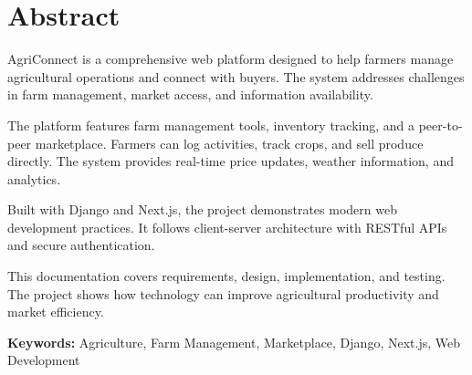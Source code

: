 \section*{Abstract}

AgriConnect is a comprehensive web platform designed to help farmers manage agricultural operations and connect with buyers. The system addresses challenges in farm management, market access, and information availability.

The platform features farm management tools, inventory tracking, and a peer-to-peer marketplace. Farmers can log activities, track crops, and sell produce directly. The system provides real-time price updates, weather information, and analytics.

Built with Django and Next.js, the project demonstrates modern web development practices. It follows client-server architecture with RESTful APIs and secure authentication.

This documentation covers requirements, design, implementation, and testing. The project shows how technology can improve agricultural productivity and market efficiency.

\textbf{Keywords:} Agriculture, Farm Management, Marketplace, Django, Next.js, Web Development